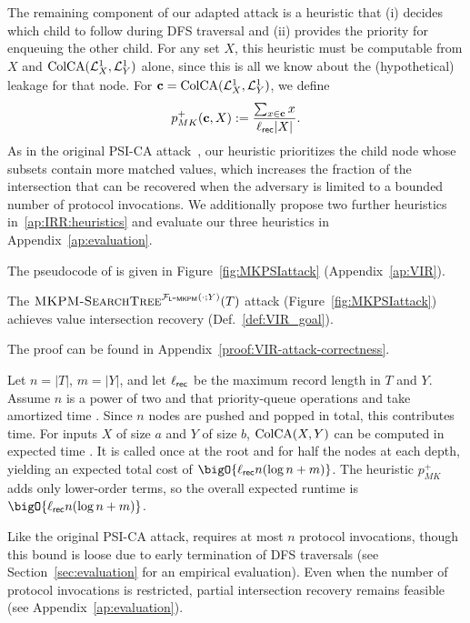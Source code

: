 The remaining component of our adapted attack is a heuristic that (i) decides which child to follow during DFS traversal and (ii) provides the priority for enqueuing the other child. For any set $X$, this heuristic must be computable from $X$ and $\text{ColCA}({\mathcal{L}^1_{X_{}}}, {\mathcal{L}^1_{Y}})$ alone, since this is all we know about the (hypothetical) leakage for that node. For $\mathbf{c} = \text{ColCA}({\mathcal{L}^1_{X_{}}}, {\mathcal{L}^1_{Y}})$, we define
\begin{equation}
      p_{MK}^+(\mathbf{c}, X) := \frac{\sum_{x \in \mathbf{c}} x}{\ell_{\mathsf{rec}} |X|}.
\end{equation}
As in the original PSI-CA attack~\cite{USENIX:GHLWJL22}, our heuristic prioritizes the child node whose subsets contain more matched values, which increases the fraction of the intersection that can be recovered when the adversary is limited to a bounded number of protocol invocations.
We additionally propose two further heuristics in~\ref{ap:IRR:heuristics} and evaluate our three heuristics in Appendix~\ref{ap:evaluation}. 

The pseudocode of \mkpsiattack{} is given in Figure~\ref{fig:MKPSIattack} (Appendix~\ref{ap:VIR}).

\begin{theorem}\label{thm:VIR-attack-correctness}
  The $\textsc{MKPM\mbox{-}SearchTree}^{\mathcal{F}_{\mathsf{L\mbox{-}MKPM}}(\cdot;Y)}(T)$ attack (Figure~\ref{fig:MKPSIattack})
  achieves value intersection recovery (Def.~\ref{def:VIR_goal}).
\end{theorem}
The proof can be found in Appendix~\ref{proof:VIR-attack-correctness}.

  Let $n = |T|$, $m = |Y|$, and let
$\ell_{\mathsf{rec}}$ be the maximum record length in $T$ and $Y$. Assume $n$ is a power
of two and that priority-queue operations \push{} and \pop{} take amortized time
. Since $n$ nodes are pushed and popped in total, this contributes
 time.  For inputs $X$ of size $a$ and $Y$ of size $b$,
$\text{ColCA}(X,Y)$ can be computed in expected time . It is
called once at the root and for half the nodes at each depth, yielding an
expected total cost of $\bigO{\ell_{\rec} n(\log n + m)}$. The heuristic
$p_{MK}^+$ adds only lower-order terms, so the overall expected runtime is
$\bigO{\ell_{\rec} n(\log n + m)}$.

Like the original PSI-CA attack, \mkpsiattack{} requires at most $n$ protocol
invocations, though this bound is loose due to early termination of DFS
traversals (see Section~\ref{sec:evaluation} for an empirical evaluation).  Even
when the number of protocol invocations is restricted, partial intersection
recovery remains feasible (see Appendix~\ref{ap:evaluation}).